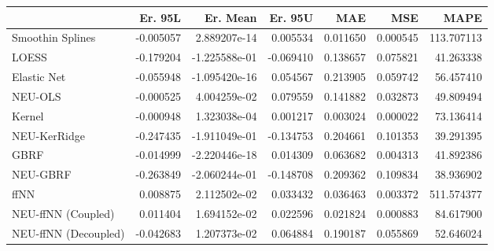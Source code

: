 \begin{tabular}{lrrrrrr}
\toprule
{} &   Er. 95L &      Er. Mean &   Er. 95U &       MAE &       MSE &        MAPE \\
\midrule
Smoothin Splines     & -0.005057 &  2.889207e-14 &  0.005534 &  0.011650 &  0.000545 &  113.707113 \\
LOESS                & -0.179204 & -1.225588e-01 & -0.069410 &  0.138657 &  0.075821 &   41.263338 \\
Elastic Net          & -0.055948 & -1.095420e-16 &  0.054567 &  0.213905 &  0.059742 &   56.457410 \\
NEU-OLS              & -0.000525 &  4.004259e-02 &  0.079559 &  0.141882 &  0.032873 &   49.809494 \\
Kernel               & -0.000948 &  1.323038e-04 &  0.001217 &  0.003024 &  0.000022 &   73.136414 \\
NEU-KerRidge         & -0.247435 & -1.911049e-01 & -0.134753 &  0.204661 &  0.101353 &   39.291395 \\
GBRF                 & -0.014999 & -2.220446e-18 &  0.014309 &  0.063682 &  0.004313 &   41.892386 \\
NEU-GBRF             & -0.263849 & -2.060244e-01 & -0.148708 &  0.209362 &  0.109834 &   38.936902 \\
ffNN                 &  0.008875 &  2.112502e-02 &  0.033432 &  0.036463 &  0.003372 &  511.574377 \\
NEU-ffNN (Coupled)   &  0.011404 &  1.694152e-02 &  0.022596 &  0.021824 &  0.000883 &   84.617900 \\
NEU-ffNN (Decoupled) & -0.042683 &  1.207373e-02 &  0.064884 &  0.190187 &  0.055869 &   52.646024 \\
\bottomrule
\end{tabular}

